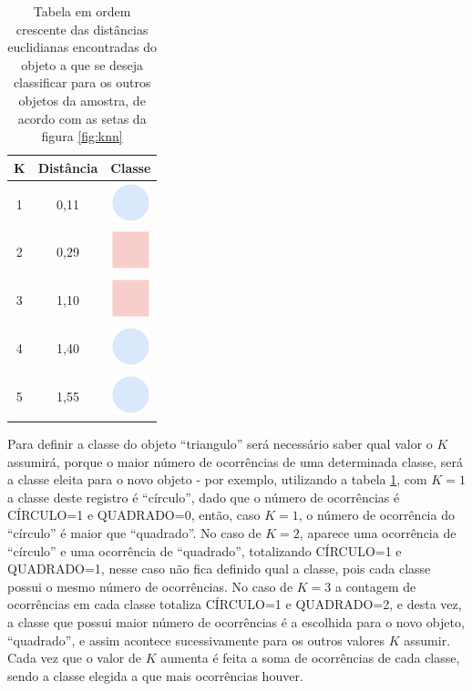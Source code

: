 \begin{table}[!ht]
\centering 
\begin{tabular}{|c|c|c|}
\hline \hline 
\rowcolor[HTML]{EFEFEF} 
K & Distância     & Classe \\ \hline
1 & 0,11       & \includegraphics[scale=0.2]{figs/circulo.png}       \\ \hline                    
2 & 0,29       &  \includegraphics[scale=0.2]{figs/quadrado.png}        \\ \hline
3 & 1,10       &  \includegraphics[scale=0.2]{figs/quadrado.png}   \\ \hline                    
4 & 1,40       &  \includegraphics[scale=0.2]{figs/circulo.png}     \\ \hline
5 & 1,55       &  \includegraphics[scale=0.2]{figs/circulo.png}     \\ \hline                    
\end{tabular}
\caption{Tabela em ordem crescente das distâncias euclidianas encontradas do objeto a que se deseja classificar para os outros objetos da amostra, de acordo com as setas da figura \ref{fig:knn}}
\label{tab:exemploKNN}
\end{table}

Para definir a classe do objeto ``triangulo'' será necessário saber qual valor o ${K}$ assumirá, porque o maior número de ocorrências de uma determinada classe, será a classe eleita para o novo objeto - por exemplo, utilizando a tabela \ref{tab:exemploKNN}, com ${K=1}$ a classe deste registro é ``círculo'', dado que o número de ocorrências é CÍRCULO=1 e QUADRADO=0, então, caso ${K=1}$, o número de ocorrência do ``círculo'' é maior que ``quadrado''. No caso de ${K=2}$, aparece uma ocorrência de ``círculo'' e uma ocorrência de ``quadrado'', totalizando CÍRCULO=1 e QUADRADO=1, nesse caso não fica definido qual a classe, pois cada classe possui o mesmo número de ocorrências. No caso de ${K=3}$ a contagem de ocorrências em cada classe totaliza CÍRCULO=1 e QUADRADO=2, e desta vez, a classe que possui maior número de ocorrências é a escolhida para o novo objeto, ``quadrado'', e assim acontece sucessivamente para os outros valores ${K}$ assumir. Cada vez que o valor de ${K}$ aumenta é feita  a soma de ocorrências de cada classe, sendo a classe elegida a que mais ocorrências houver.

